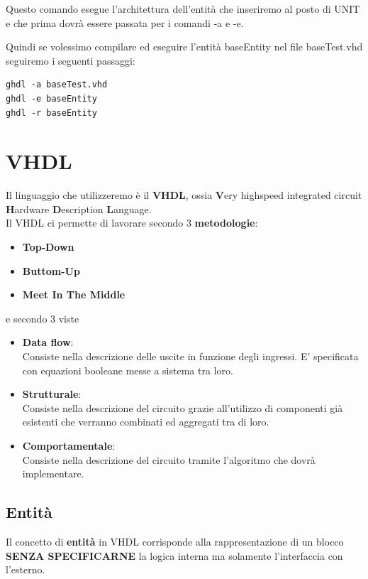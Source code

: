 \documentclass[a4paper]{book}
\begin{document}
Questo comando esegue l'architettura dell'entità che inseriremo al posto di UNIT e che prima dovrà essere passata per i comandi -a e -e.



Quindi se volessimo compilare ed eseguire l'entità baseEntity nel file baseTest.vhd seguiremo i seguenti passaggi:
\begin{verbatim}
ghdl -a baseTest.vhd
ghdl -e baseEntity
ghdl -r baseEntity
\end{verbatim}

\section{VHDL}

Il linguaggio che utilizzeremo è il \textbf{VHDL}, ossia \textbf{V}ery highspeed integrated circuit \textbf{H}ardware \textbf{D}escription \textbf{L}anguage.\\
Il VHDL ci permette di lavorare secondo 3 \textbf{metodologie}: 
\begin{itemize}
\item \textbf{Top-Down}
\item \textbf{Buttom-Up}
\item \textbf{Meet In The Middle}
\end{itemize}

e secondo 3 viste

\begin{itemize}
\item \textbf{Data flow}: \\ Consiste nella descrizione delle uscite in funzione degli ingressi. E' specificata con equazioni booleane messe a sistema tra loro.
\item \textbf{Strutturale}:\\ Consiste nella descrizione del circuito grazie all'utilizzo di componenti già esistenti che verranno combinati ed aggregati tra di loro. 
\item \textbf{Comportamentale}: \\ Consiste nella descrizione del circuito tramite l'algoritmo che dovrà implementare.
\end{itemize}



\subsection{Entità}

Il concetto di \textbf{entità} in VHDL corrisponde alla rappresentazione di un blocco \textbf{SENZA SPECIFICARNE} la logica interna ma solamente l'interfaccia con l'esterno.
\end{document}
